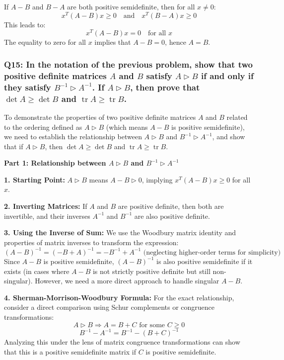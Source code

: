 \documentclass[8pt]{article}
\begin{document}
{If \(A - B\) and \(B - A\) are both positive semidefinite, then for all \(x \neq 0\):
\[
x^T (A - B) x \geq 0 \quad \text{and} \quad x^T (B - A) x \geq 0
\]
This leads to:
\[
x^T (A - B) x = 0 \quad \text{for all } x
\]
The equality to zero for all \(x\) implies that \(A - B = 0\), hence \(A = B\).

\subsubsection*{Q15: In the notation of the previous problem, show that two positive definite matrices \(A\) and \(B\) satisfy \(A \triangleright B\) if and only if they satisfy \(B^{-1} \triangleright A^{-1}\). If \(A \triangleright B\), then prove that \(\det A \geq \det B\) and \(\operatorname{tr} A \geq \operatorname{tr} B\).}

To demonstrate the properties of two positive definite matrices \(A\) and \(B\) related to the ordering defined as \(A \triangleright B\) (which means \(A - B\) is positive semidefinite), we need to establish the relationship between \(A \triangleright B\) and \(B^{-1} \triangleright A^{-1}\), and show that if \(A \triangleright B\), then \(\det A \geq \det B\) and \(\operatorname{tr} A \geq \operatorname{tr} B\).

\textbf{Part 1: Relationship between \(A \triangleright B\) and \(B^{-1} \triangleright A^{-1}\)}

\textbf{1. Starting Point:}
   \(A \triangleright B\) means \(A - B \triangleright 0\), implying \(x^T (A - B) x \geq 0\) for all \(x\).

\textbf{2. Inverting Matrices:}
   If \(A\) and \(B\) are positive definite, then both are invertible, and their inverses \(A^{-1}\) and \(B^{-1}\) are also positive definite.

\textbf{3. Using the Inverse of Sum:}
   We use the Woodbury matrix identity and properties of matrix inverses to transform the expression:
   \[
   (A - B)^{-1} = (-B + A)^{-1} = -B^{-1} + A^{-1} \text{ (neglecting higher-order terms for simplicity)}
   \]
   Since \(A - B\) is positive semidefinite, \((A - B)^{-1}\) is also positive semidefinite if it exists (in cases where \(A - B\) is not strictly positive definite but still non-singular). However, we need a more direct approach to handle singular \(A-B\).

\textbf{4. Sherman-Morrison-Woodbury Formula:}
   For the exact relationship, consider a direct comparison using Schur complements or congruence transformations:
   \[
   A \triangleright B \Rightarrow A = B + C \text{ for some } C \geq 0
   \]
   \[
   B^{-1} - A^{-1} = B^{-1} - (B + C)^{-1}
   \]
   Analyzing this under the lens of matrix congruence transformations can show that this is a positive semidefinite matrix if \(C\) is positive semidefinite.

}
\end{document}
